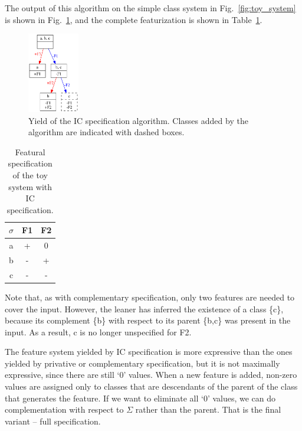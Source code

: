 \documentclass[12pt, oneside]{article}   	%
\begin{document}
The output of this algorithm on the simple class system in Fig.~\ref{fig:toy_system} is shown in Fig.~\ref{fig:toy_system_ic}, and the complete featurization is shown in Table~\ref{table:toy_system_ic}. 

\begin{figure}[htb!]
	\centering
	\includegraphics[width=0.2\textwidth]{toy_system_ic.png}
	\caption{Yield of the IC specification algorithm. Classes added by the algorithm are indicated with dashed boxes.}
	\label{fig:toy_system_ic}
\end{figure}

\begin{table}[h]
	\centering
	\begin{tabular} {|c||c|c|}
		\hline
		$\sigma$ & F1 & F2 \\ \hline
		a & + & 0 \\
		b & - & + \\
		c & - & - \\
		\hline
	\end{tabular}
	\caption{Featural specification of the toy system with IC specification.}
	\label{table:toy_system_ic}
\end{table}

Note that, as with complementary specification, only two features are needed to cover the input. However, the leaner has inferred the existence of a class \{c\}, because its complement \{b\} with respect to its parent \{b,c\} was present in the input. As a result, c is no longer unspecified for F2.

The feature system yielded by IC specification is more expressive than the ones yielded by privative or complementary specification, but it is not maximally expressive, since there are still `$0$' values. When a new feature is added, non-zero values are assigned only to classes that are descendants of the parent of the class that generates the feature. If we want to eliminate all `$0$' values, we can do complementation with respect to $\Sigma$ rather than the parent. That is the final variant -- full specification.

\FloatBarrier
\end{document}
